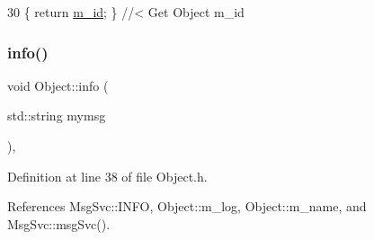 \begin{DoxyCode}
30 \{ \textcolor{keywordflow}{return} \hyperlink{classObject_aca74b9dbfed7b5556ea2d56c65b6b6b0}{m\_id};         \} \textcolor{comment}{//< Get Object m\_id }
\end{DoxyCode}
\mbox{\label{classObject_a644fd329ea4cb85f54fa6846484b84a8}} 
\subsubsection{\texorpdfstring{info()}{info()}\hspace{0.1cm}{\footnotesize\ttfamily [1/2]}}
{\footnotesize\ttfamily void Object\+::info (\begin{DoxyParamCaption}\item[{std\+::string}]{mymsg }\end{DoxyParamCaption})\hspace{0.3cm}{\ttfamily [inline]}, {\ttfamily [inherited]}}



Definition at line 38 of file Object.\+h.



References Msg\+Svc\+::\+I\+N\+FO, Object\+::m\+\_\+log, Object\+::m\+\_\+name, and Msg\+Svc\+::msg\+Svc().



